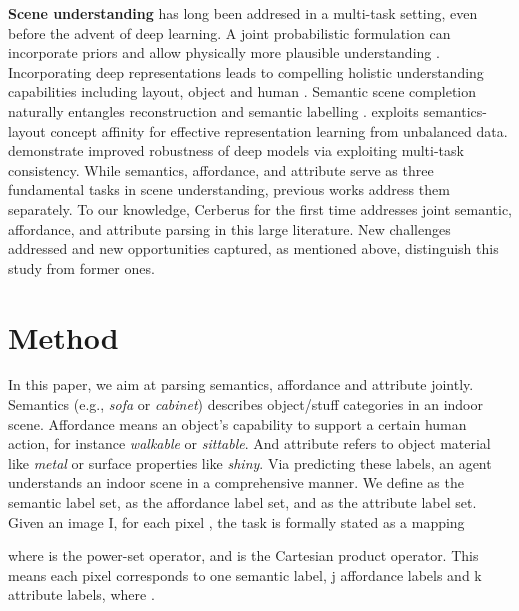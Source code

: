 \documentclass[10pt,twocolumn,letterpaper]{article}
\begin{document}
\textbf{Scene understanding} has long been addresed in a multi-task setting, even before the advent of deep learning. A joint probabilistic formulation can incorporate priors and allow physically more plausible understanding \cite{hedau2010thinking} \cite{schwing2013box}\cite{choi2015indoor}. Incorporating deep representations leads to compelling holistic understanding capabilities including layout, object and human \cite{chen2019holistic++}\cite{nie2020total3dunderstanding}\cite{zhang2021holistic}. Semantic scene completion naturally entangles reconstruction and semantic labelling \cite{song2017semantic}\cite{zhang2018efficient}\cite{zhang2019cascaded}\cite{chen20203d}. \cite{zhao2017physics} exploits semantics-layout concept affinity for effective representation learning from unbalanced data. \cite{zamir2020robust}\cite{mao2020multitask} demonstrate improved robustness of deep models via exploiting multi-task consistency. While semantics, affordance, and attribute serve as three fundamental tasks in scene understanding, previous works\cite{parikh2011relative}\cite{kumar2009attribute}\cite{patterson2012sun}\cite{do2018affordancenet}\cite{sawatzky2017weakly}\cite{shotton2009textonboost}\cite{ladicky2009associative} \cite{krahenbuhl2011efficient}\cite{sawatzky2019object} address them separately. To our knowledge, Cerberus for the first time addresses joint semantic, affordance, and attribute parsing in this large literature. New challenges addressed and new opportunities captured, as mentioned above, distinguish this study from former ones.

\section{Method}

In this paper, we aim at parsing semantics, affordance and attribute jointly. Semantics (e.g., \emph{sofa} or \emph{cabinet}) describes object/stuff categories in an indoor scene. Affordance means an object's capability to support a certain human action, for instance \emph{walkable} or \emph{sittable}. And attribute refers to object material like \emph{metal} or surface properties like \emph{shiny}. Via predicting these labels, an agent understands an indoor scene in a comprehensive manner. We define  as the semantic label set,  as the affordance label set, and  as the attribute label set. Given an image I, for each pixel , the task is formally stated as a mapping

where  is the power-set operator, and  is the Cartesian product operator. This means each pixel corresponds to one semantic label, j affordance labels and k attribute labels, where .
\end{document}
